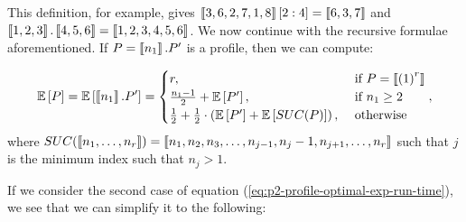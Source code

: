 This definition, for example, gives $\left\llbracket 3,6,2,7,1,8 \right\rrbracket[2:4] = \left\llbracket 6,3,7 \right\rrbracket$ and $\left\llbracket 1,2,3 \right\rrbracket.\left\llbracket 4,5,6 \right\rrbracket=\left\llbracket 1,2,3,4,5,6 \right\rrbracket$.
We now continue with the recursive formulae aforementioned. If $P=\left\llbracket n_1 \right\rrbracket. P'$ is a profile, then we can compute:

\begin{equation}
  \label{eq:p2-profile-optimal-exp-run-time}
  \mathbb{E}\left[ P \right] =
  \mathbb{E}\left[ \left\llbracket n_1 \right\rrbracket . P' \right] =
  \begin{cases}
    r, & \text{ if } P = \left\llbracket {(1)}^{r} \right\rrbracket \\
    \frac{n_1-1}{2} + \mathbb{E}\left[ P' \right] , & \text{ if } n_1\geq 2 \\
    \frac{1}{2} + \frac{1}{2} \cdot \left( \mathbb{E}\left[ P' \right] + \mathbb{E}\left[ SUC(P) \right] \right) ,& \text{ otherwise } 
  \end{cases},
\end{equation}
where $SUC(\left\llbracket n_1,\dots,n_r \right\rrbracket) = \left\llbracket n_1, n_2, n_3,\dots,n_{j-1},n_j-1,n_{j+1},\dots,n_r \right\rrbracket$ such that $j$ is the minimum index such that $n_j>1$.

If we consider the second case of equation (\ref{eq:p2-profile-optimal-exp-run-time}), we see that we can simplify it to the following:

